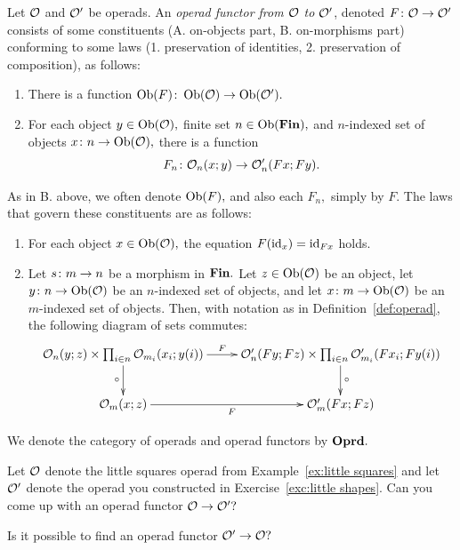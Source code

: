 \documentclass[../main/CT4S-EN-RU]{subfiles}
\begin{document}
\begin{warningRUS}
\end{warningRUS}

\begin{definitionENG}\label{def:operad morphism}
Let $\mathcal{O}$ and $\mathcal{O}'$ be operads. An {\em operad functor from $\mathcal{O}$ to $\mathcal{O}'$}, denoted $F\colon\mathcal{O}\rightarrow\mathcal{O}'$ consists of some constituents (A. on-objects part, B. on-morphisms part) conforming to some laws (1. preservation of identities, 2. preservation of composition), as follows:
\begin{enumerate}[\hsp A.]
\item There is a function $\operatorname{Ob}(F)\colon\operatorname{Ob}(\mathcal{O})\rightarrow\operatorname{Ob}(\mathcal{O}').$
\item For each object $y\in\operatorname{Ob}(\mathcal{O}),$ finite set $n\in\operatorname{Ob}({\mathbf{Fin}}),$ and $n$-indexed set of objects $x\colon n\rightarrow\operatorname{Ob}(\mathcal{O}),$ there is a function $$F_n\colon\mathcal{O}_n(x;y)\rightarrow\mathcal{O}'_n(Fx;Fy).$$
\end{enumerate}
As in B. above, we often denote $\operatorname{Ob}(F),$ and also each $F_n,$ simply by $F.$ The laws that govern these constituents are as follows:
\begin{enumerate}[\hsp 1.]
\item For each object $x\in\operatorname{Ob}(\mathcal{O}),$ the equation $F(\operatorname{id}_x)=\operatorname{id}_{Fx}$ holds.
\item Let $s\colon m\rightarrow n$ be a morphism in ${\mathbf{Fin}}.$ Let $z\in\operatorname{Ob}(\mathcal{O})$ be an object, let $y\colon n\rightarrow\operatorname{Ob}(\mathcal{O})$ be an $n$-indexed set of objects, and let $x\colon m\rightarrow\operatorname{Ob}(\mathcal{O})$ be an $m$-indexed set of objects. Then, with notation as in Definition~\ref{def:operad}, the following diagram of sets commutes:
\begin{align}\label{dia:operad functor on composition}
\xymatrix{
\mcO_n(y;z)\times\prod_{i\in n}\mcO_{m_i}(x_i;y(i))\ar[r]^-F\ar[d]_\circ&
\mcO'_n(Fy;Fz)\times\prod_{i\in n}\mcO'_{m_i}(Fx_i;Fy(i))\ar[d]^\circ\\
\mcO_m(x;z)\ar[r]_F&\mcO'_m(Fx;Fz)
}
\end{align}
\end{enumerate}

We denote the category of operads and operad functors by ${\mathbf{Oprd}}.$
\end{definitionENG}

\begin{definitionRUS}\label{def:operad morphism}
\end{definitionRUS}

\begin{exerciseENG}
Let $\mathcal{O}$ denote the little squares operad from Example~\ref{ex:little squares} and let $\mathcal{O}'$ denote the operad you constructed in Exercise~\ref{exc:little shapes}.
\sexc Can you come up with an operad functor $\mathcal{O}\rightarrow\mathcal{O}'?$
\item Is it possible to find an operad functor $\mathcal{O}'\rightarrow\mathcal{O}?$ 
\endsexc
\end{exerciseENG}
\end{document}
